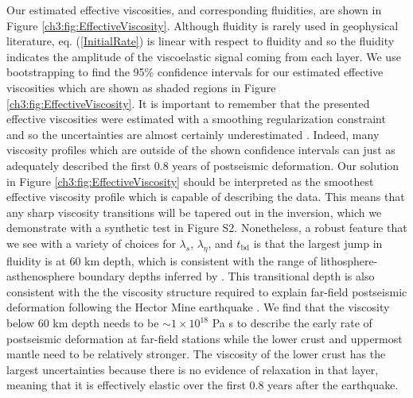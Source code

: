 Our estimated effective viscosities, and corresponding fluidities, are shown in Figure \ref{ch3:fig:EffectiveViscosity}.  Although fluidity is rarely used in geophysical literature, eq. (\ref{InitialRate}) is linear with respect to fluidity and so the fluidity indicates the amplitude of the viscoelastic signal coming from each layer.  We use bootstrapping to find the 95\% confidence intervals for our estimated effective viscosities which are shown as shaded regions in Figure \ref{ch3:fig:EffectiveViscosity}.  It is important to remember that the presented effective viscosities were estimated with a smoothing regularization constraint and so the uncertainties are almost certainly underestimated \citep{Aster2011}.  Indeed, many viscosity profiles which are outside of the shown confidence intervals can just as adequately described the first 0.8 years of postseismic deformation. Our solution in Figure \ref{ch3:fig:EffectiveViscosity} should be interpreted as the smoothest effective viscosity profile which is capable of describing the data.  This means that any  sharp viscosity transitions will be tapered out in the inversion, which we demonstrate with a synthetic test in Figure S2.  Nonetheless, a robust feature that we see with a variety of choices for $\lambda_s$, $\lambda_\eta$, and $t_\mathrm{bd}$ is that the largest jump in fluidity is at 60 km depth, which is consistent with the range of lithosphere-asthenosphere boundary depths inferred by \citet{Lekic2011}. This transitional depth is also consistent with the the viscosity structure required to explain far-field postseismic deformation following the Hector Mine earthquake \citep{Freed2007a}. We find that the viscosity below 60 km depth needs to be ${\sim}1\times10^{18}$ Pa s to describe the early rate of postseismic deformation at far-field stations while the lower crust and uppermost mantle need to be relatively stronger.  The viscosity of the lower crust has the largest uncertainties because there is no evidence of relaxation in that layer, meaning that it is effectively elastic over the first 0.8 years after the earthquake.  

